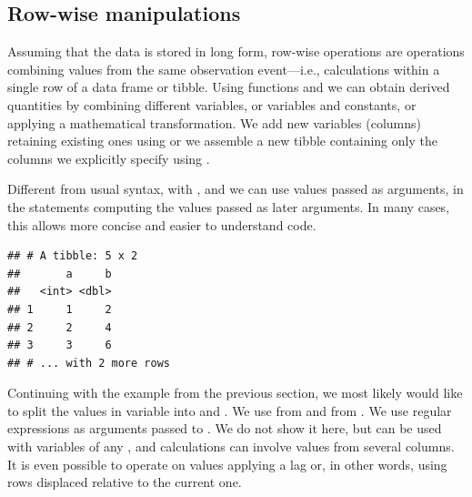 \documentclass[krantz2]{krantz}\usepackage{knitr}
\begin{document}
\subsection{Row-wise manipulations}

Assuming that the data is stored in long form, row-wise operations are operations combining values from the same observation event---i.e., calculations within a single row of a data frame or tibble. Using functions  and  we can obtain derived quantities by combining different variables, or variables and constants, or applying a mathematical transformation. We add new variables (columns) retaining existing ones using  or we assemble a new tibble containing only the columns we explicitly specify using .

\begin{explainbox}
Different from usual \Rlang syntax, with ,  and  we can use values passed as arguments, in the statements computing the values passed as later arguments. In many cases, this allows more concise and easier to understand code.

\begin{knitrout}\footnotesize
{}\color{fgcolor}\begin{kframe}
\begin{alltt}
\hlstd{(} \hlstd{=} \hlopt{:}\hlstd{,}  \hlstd{=}  \hlopt{*} 
\end{alltt}
\begin{verbatim}
## # A tibble: 5 x 2
##       a     b
##   <int> <dbl>
## 1     1     2
## 2     2     4
## 3     3     6
## # ... with 2 more rows
\end{verbatim}
\end{kframe}
\end{knitrout}
\end{explainbox}

Continuing with the example from the previous section, we most likely would like to split the values in variable  into  and . We use  from  and  from . We use regular expressions as arguments passed to .  We do not show it here, but  can be used with variables of any , and calculations can involve values from several columns. It is even possible to operate on values applying a lag or, in other words, using rows displaced relative to the current one.
\end{document}
